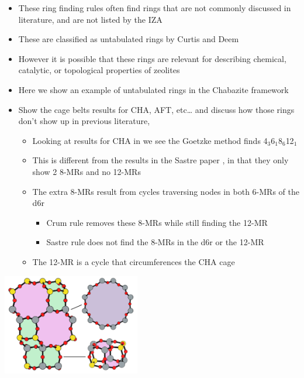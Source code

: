 \documentclass[11pt]{article}
\begin{document}
\newpage

\begin{itemize}
\item These ring finding rules often find rings that are not commonly discussed in literature, and are not listed by the IZA
\item These are classified as untabulated rings by Curtis and Deem \cite{curtis-statistical-2003}
\item However it is possible that these rings are relevant for describing chemical, catalytic, or topological properties of zeolites
\item Here we show an example of untabulated rings in the Chabazite framework
\item Show the cage belts results for CHA, AFT, etc\ldots{} and discuss how those rings don't show up in previous literature, 
\begin{itemize}
\item Looking at results for CHA in  we see the Goetzke method finds 4\(_{\text{3}}\)\textbullet{}6\(_{\text{1}}\)\textbullet{}8\(_{\text{6}}\)\textbullet{}12\(_{\text{1}}\)
\item This is different from the results in the Sastre paper \cite{sastre-topological-2009}, in that they only show 2 8-MRs and no 12-MRs
\item The extra 8-MRs result from cycles traversing nodes in both 6-MRs of the d6r
\begin{itemize}
\item Crum rule removes these 8-MRs while still finding the 12-MR
\item Sastre rule does not find the 8-MRs in the d6r or the 12-MR
\end{itemize}
\item The 12-MR is a cycle that circumferences the CHA cage
\end{itemize}
\end{itemize}
\begin{center}
\includegraphics[width=0.45\textwidth]{../figures/completed-figures/cha-all-rings.pdf}
\end{center}
\end{document}
